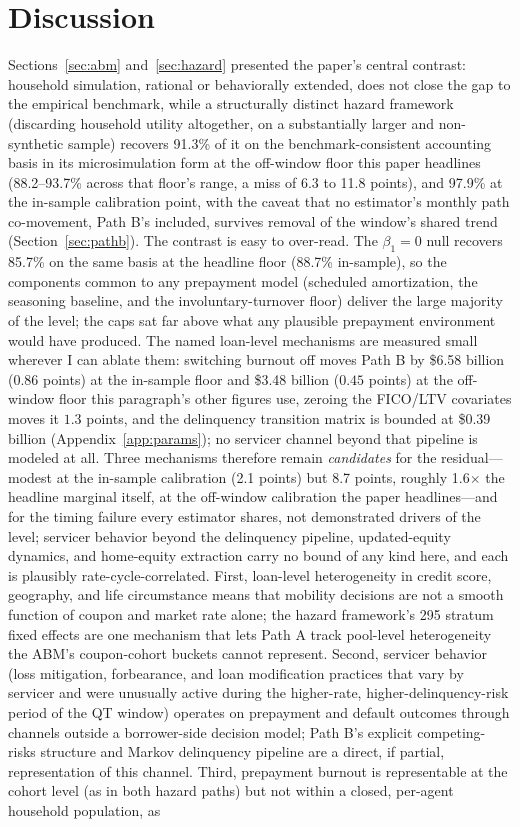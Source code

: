 \documentclass[12pt]{article}
\begin{document}
\section{Discussion}\label{sec:discussion}

Sections~\ref{sec:abm} and~\ref{sec:hazard} presented the paper's central contrast: household simulation, rational or behaviorally extended, does not close the gap to the empirical benchmark, while a structurally distinct hazard framework (discarding household utility altogether, on a substantially larger and non-synthetic sample) recovers 91.3\% of it on the benchmark-consistent accounting basis in its microsimulation form at the off-window floor this paper headlines (88.2--93.7\% across that floor's range, a miss of 6.3 to 11.8 points), and 97.9\% at the in-sample calibration point, with the caveat that no estimator's monthly path co-movement, Path B's included, survives removal of the window's shared trend (Section~\ref{sec:pathb}). The contrast is easy to over-read. The $\beta_1 = 0$ null recovers 85.7\% on the same basis at the headline floor (88.7\% in-sample), so the components common to any prepayment model (scheduled amortization, the seasoning baseline, and the involuntary-turnover floor) deliver the large majority of the level; the caps sat far above what any plausible prepayment environment would have produced. The named loan-level mechanisms are measured small wherever I can ablate them: switching burnout off moves Path B by \$6.58 billion ($0.86$ points) at the in-sample floor and \$3.48 billion ($0.45$ points) at the off-window floor this paragraph's other figures use, zeroing the FICO/LTV covariates moves it $1.3$ points, and the delinquency transition matrix is bounded at \$0.39 billion (Appendix~\ref{app:params}); no servicer channel beyond that pipeline is modeled at all. Three mechanisms therefore remain \emph{candidates} for the residual---modest at the in-sample calibration (2.1 points) but 8.7 points, roughly 1.6$\times$ the headline marginal itself, at the off-window calibration the paper headlines---and for the timing failure every estimator shares, not demonstrated drivers of the level; servicer behavior beyond the delinquency pipeline, updated-equity dynamics, and home-equity extraction carry no bound of any kind here, and each is plausibly rate-cycle-correlated. First, loan-level heterogeneity in credit score, geography, and life circumstance means that mobility decisions are not a smooth function of coupon and market rate alone; the hazard framework's 295 stratum fixed effects are one mechanism that lets Path A track pool-level heterogeneity the ABM's coupon-cohort buckets cannot represent. Second, servicer behavior (loss mitigation, forbearance, and loan modification practices that vary by servicer and were unusually active during the higher-rate, higher-delinquency-risk period of the QT window) operates on prepayment and default outcomes through channels outside a borrower-side decision model; Path B's explicit competing-risks structure and Markov delinquency pipeline are a direct, if partial, representation of this channel. Third, prepayment burnout is representable at the cohort level (as in both hazard paths) but not within a closed, per-agent household population, as 
\end{document}
